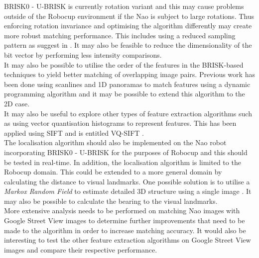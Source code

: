 \documentclass[11pt]{report}
\begin{document}
BRISK0 - U-BRISK is currently rotation variant and this may cause problems outside of the Robocup environment if the Nao is subject to large rotations. Thus enforcing rotation invariance and optimising the algorithm differently may create more robust matching performance. This includes using a reduced sampling pattern as suggest in \cite{Leutenegger2011}. It may also be feasible to reduce the dimensionality of the bit vector by performing less intensity comparisons. \\

It may also be possible to utilise the order of the features in the BRISK-based techniques to yield better matching of overlapping image pairs. Previous work has been done using scanlines and 1D panoramas to match features using a dynamic programming algorithm \cite{Birchfield1998, Way1996, Briggs} and it may be possible to extend this algorithm to the 2D case.\\

It may also be useful to explore other types of feature extraction algorithms such as using vector quantisation histograms to represent features. This has been applied using SIFT and is entitled VQ-SIFT \cite{Chen2011}.\\

The localisation algorithm should also be implemented on the Nao robot incorporating BRISK0 - U-BRISK for the purposes of Robocup and this should be tested in real-time. In addition, the localisation algorithm is limited to the Robocup domain. This could be extended to a more general domain by calculating the distance to visual landmarks. One possible solution is to utilise a \textit{Markox Random Field} to estimate detailed 3D structure using a single image \cite{Saxena}. It may also be possible to calculate the bearing to the visual landmarks. \\ 

More extensive analysis needs to be performed on matching Nao images with Google Street View images to determine further improvements that need to be made to the algorithm in order to increase matching accuracy. It would also be interesting to test the other feature extraction algorithms on Google Street View images and compare their respective performance.\\





 \newpage
\onecolumn
\appendix
\setcounter{table}{0}
\setcounter{figure}{0}
\setcounter{subsection}{0}
\makeatletter \renewcommand{\thefigure}{A.\@arabic\c@figure} \renewcommand{\thetable}{A.\@arabic\c@table} \renewcommand{\thesection}{A.\@arabic\c@section} \makeatother
\end{document}
